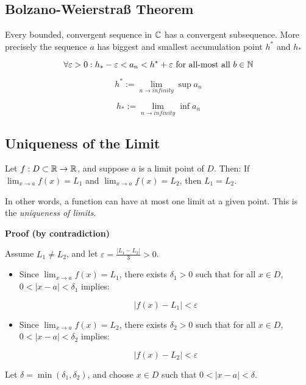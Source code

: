 \subsection{Bolzano-Weierstraß Theorem}

Every bounded, convergent sequence in \(\mathbb{C}\) has a convergent subsequence.
More precisely the sequence \(a\) has biggest and smallest accumulation point \(h^*\) and \(h_*\)

\[
    \forall \varepsilon > 0 : h_* - \varepsilon < a_n < h^{*} + \varepsilon \text{ for all-most all } 
    b \in \mathbb{N}
\]

\[
    h^* := \lim_{n \to infinity} \sup a_n
\]

\[
    h_* := \lim_{n \to infinity} \inf a_n
\]

\subsection{Uniqueness of the Limit}

Let \( f: D \subset \mathbb{R} \to \mathbb{R} \), and suppose \( a \) is a limit point of \( D \). Then:
If \( \lim_{x \to a} f(x) = L_1 \) and \( \lim_{x \to a} f(x) = L_2 \), then \( L_1 = L_2 \).
\vspace{\baselineskip}

In other words, a function can have at most one limit at a given point. This is the \emph{uniqueness of limits}.

\textbf{Proof (by contradiction)}

Assume \( L_1 \ne L_2 \), and let \( \varepsilon = \frac{|L_1 - L_2|}{3} > 0 \).

\begin{itemize}

    \item Since \( \lim_{x \to a} f(x) = L_1 \), there exists \( \delta_1 > 0 \) such that for all \( x \in D \), \( 0 < |x - a| < \delta_1 \) implies:

    \[
        |f(x) - L_1| < \varepsilon
    \]
    
    \item Since \( \lim_{x \to a} f(x) = L_2 \), there exists \( \delta_2 > 0 \) such that for all \( x \in D \), \( 0 < |x - a| < \delta_2 \) implies:

    \[
        |f(x) - L_2| < \varepsilon
    \]

\end{itemize}

Let \( \delta = \min(\delta_1, \delta_2) \), and choose \( x \in D \) such that \( 0 < |x - a| < \delta \).

